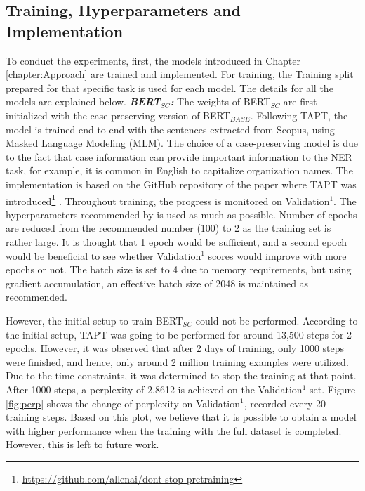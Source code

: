 \documentclass{report}
\theoremstyle{definition}
\theoremstyle{remark}
\begin{document}
\subsection{Training, Hyperparameters and Implementation}
\label{sec:EvalExpSetupTraining}
To conduct the experiments, first, the models introduced in Chapter \ref{chapter:Approach} are trained and implemented. For training, the Training split prepared for that specific task is used for each model. The details for all the models are explained below.
\newline
\newline
\textit{\textbf{BERT}}$_{SC}$\textit{\textbf{:}}
The weights of BERT$_{SC}$ are first initialized with the case-preserving version of BERT$_{BASE}$. Following TAPT, the model is trained end-to-end with the sentences extracted from Scopus, using Masked Language Modeling (MLM). The choice of a case-preserving model is due to the fact that case information can provide important information to the NER task, for example, it is common in English to capitalize organization names. The implementation is based on the GitHub repository of the paper where TAPT was introduced\footnote{\url{https://github.com/allenai/dont-stop-pretraining}} \cite{DontStop}. Throughout training, the progress is monitored on Validation$^1$. The hyperparameters recommended by \cite{DontStop} is used as much as possible. Number of epochs are reduced from the recommended number (100) to 2 as the training set is rather large. It is thought that 1 epoch would be sufficient, and a second epoch would be beneficial to see whether Validation$^1$ scores would improve with more epochs or not. The batch size is set to 4 due to memory requirements, but using gradient accumulation, an effective batch size of 2048 is maintained as recommended. 

However, the initial setup to train BERT$_{SC}$ could not be performed. According to the initial setup, TAPT was going to be performed for around 13,500 steps for 2 epochs. However, it was observed that after 2 days of training, only 1000 steps were finished, and hence, only around 2 million training examples were utilized. Due to the time constraints, it was determined to stop the training at that point. After 1000 steps, a perplexity of 2.8612 is achieved on the Validation$^1$ set. Figure \ref{fig:perp} shows the change of perplexity on Validation$^1$, recorded every 20 training steps. Based on this plot, we believe that it is possible to obtain a model with higher performance when the training with the full dataset is completed. However, this is left to future work.
\end{document}
